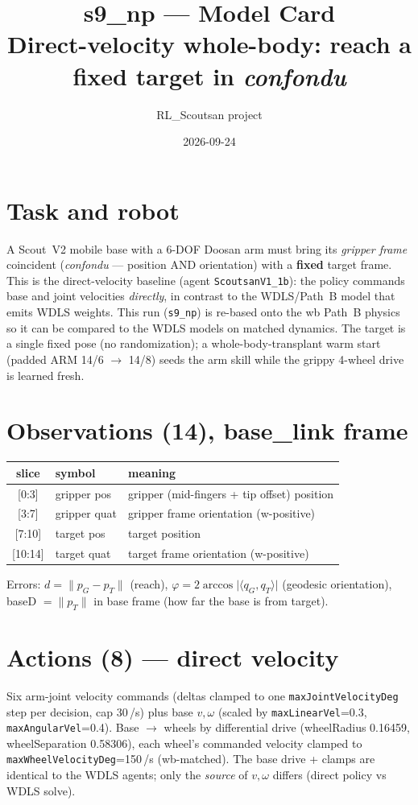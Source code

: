 \documentclass[11pt]{article}
\title{\vspace{-1.5em}s9\_np --- Model Card\\[2pt]
\large Direct-velocity whole-body: reach a fixed target in \emph{confondu}}
\author{RL\_Scoutsan project}
\date{2026-09-24}
\newcommand{\code}[1]{\texttt{#1}}
\begin{document}
\maketitle
\vspace{-1em}

\section{Task and robot}
A Scout~V2 mobile base with a 6-DOF Doosan arm must bring its \emph{gripper frame} coincident
(\emph{confondu} --- position AND orientation) with a \textbf{fixed} target frame. This is the
direct-velocity baseline (agent \code{ScoutsanV1\_1b}): the policy commands base and joint
velocities \emph{directly}, in contrast to the WDLS/Path~B model that emits WDLS weights. This run
(\code{s9\_np}) is re-based onto the wb Path~B physics so it can be compared to the WDLS models on
matched dynamics. The target is a single fixed pose (no randomization); a whole-body-transplant
warm start (padded ARM 14/6 $\to$ 14/8) seeds the arm skill while the grippy 4-wheel drive is
learned fresh.

\section{Observations (14), base\_link frame}
\begin{center}
\begin{tabular}{cll}
\hline
slice & symbol & meaning\\
\hline
{[0:3]}  & gripper pos  & gripper (mid-fingers + tip offset) position\\
{[3:7]}  & gripper quat & gripper frame orientation (w-positive)\\
{[7:10]} & target pos   & target position\\
{[10:14]}& target quat  & target frame orientation (w-positive)\\
\hline
\end{tabular}
\end{center}
Errors: $d=\lVert p_G-p_T\rVert$ (reach), $\varphi=2\arccos\lvert\langle q_G,q_T\rangle\rvert$
(geodesic orientation), baseD $=\lVert p_T\rVert$ in base frame (how far the base is from target).

\section{Actions (8) --- direct velocity}
Six arm-joint velocity commands (deltas clamped to one \code{maxJointVelocityDeg} step per decision,
cap 30\,\textdegree/s) plus base $v,\omega$ (scaled by \code{maxLinearVel}=0.3, \code{maxAngularVel}=0.4).
Base $\to$ wheels by differential drive (wheelRadius 0.16459, wheelSeparation 0.58306), each wheel's
commanded velocity clamped to \code{maxWheelVelocityDeg}=150\,\textdegree/s (wb-matched). The base
drive + clamps are identical to the WDLS agents; only the \emph{source} of $v,\omega$ differs
(direct policy vs WDLS solve).
\end{document}
